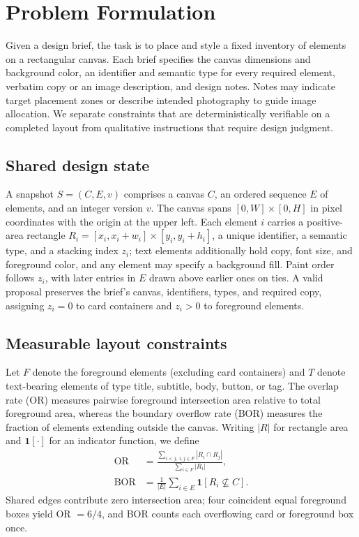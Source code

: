 \section{Problem Formulation}
\label{sec:formulation}

Given a design brief, the task is to place and style a fixed inventory of
elements on a rectangular canvas. Each brief specifies the canvas dimensions and
background color, an identifier and semantic type for every required element,
verbatim copy or an image description, and design notes. Notes may indicate
target placement zones or describe intended photography to guide image
allocation. We separate constraints that are deterministically verifiable on a
completed layout from qualitative instructions that require design judgment.

\subsection{Shared design state}
A snapshot \(S=(C,E,v)\) comprises a canvas \(C\), an ordered sequence \(E\) of
elements, and an integer version \(v\). The canvas spans
\([0,W]\times[0,H]\) in pixel coordinates with the origin at the upper left.
Each element \(i\) carries a positive-area rectangle
\(R_i=[x_i,x_i+w_i]\times[y_i,y_i+h_i]\), a unique identifier, a semantic type,
and a stacking index \(z_i\); text elements additionally hold copy, font size,
and foreground color, and any element may specify a background fill. Paint order
follows \(z_i\), with later entries in \(E\) drawn above earlier ones on ties.
A valid proposal preserves the brief's canvas, identifiers, types, and required
copy, assigning \(z_i=0\) to card containers and \(z_i>0\) to foreground
elements.

\subsection{Measurable layout constraints}
Let \(F\) denote the foreground elements (excluding card containers) and \(T\)
denote text-bearing elements of type title, subtitle, body, button, or tag. The
overlap rate (OR) measures pairwise foreground intersection area relative to
total foreground area, whereas the boundary overflow rate (BOR) measures the
fraction of elements extending outside the canvas. Writing \(|R|\) for rectangle
area and \(\mathbf{1}[\cdot]\) for an indicator function, we define
\begin{align}
  \mathrm{OR} &= \frac{\sum_{i<j,\;i,j\in F}|R_i\cap R_j|}
                       {\sum_{i\in F}|R_i|}, \label{eq:overlap}\\
  \mathrm{BOR} &= \frac{1}{|E|}\sum_{i\in E}\mathbf{1}[R_i\not\subseteq C].
  \label{eq:overflow}
\end{align}
Shared edges contribute zero intersection area; four coincident equal foreground
boxes yield OR $=6/4$, and BOR counts each overflowing card or foreground box
once.


